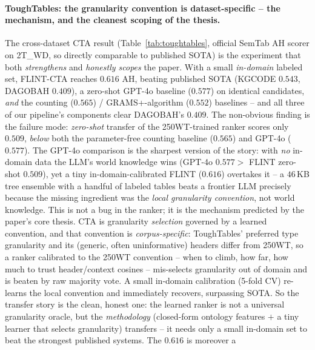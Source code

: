 \paragraph{ToughTables: the granularity convention is dataset-specific -- the mechanism, and the cleanest scoping of the thesis.}
The cross-dataset CTA result (Table~\ref{tab:toughtables}, official SemTab AH scorer
on 2T\_WD, so directly comparable to published SOTA) is the experiment that both
\emph{strengthens} and \emph{honestly scopes} the paper. With a small \emph{in-domain}
labeled set, FLINT-CTA reaches $\mathbf{0.616}$ AH, beating published SOTA (KGCODE
$0.543$, DAGOBAH $0.409$), a zero-shot GPT-4o baseline ($0.577$) on identical
candidates, \emph{and} the counting ($0.565$) / GRAMS+-algorithm ($0.552$) baselines
-- and all three of our pipeline's components clear DAGOBAH's $0.409$. The non-obvious
finding is the failure mode: \emph{zero-shot} transfer of the 250WT-trained ranker
scores only $0.509$, \emph{below} both the parameter-free counting baseline ($0.565$)
and GPT-4o ($0.577$). The GPT-4o comparison is the sharpest version of the story: with
\emph{no} in-domain data the LLM's world knowledge wins (GPT-4o $0.577 >$ FLINT
zero-shot $0.509$), yet a tiny in-domain-calibrated FLINT ($0.616$) overtakes it -- a
$46$\,KB tree ensemble with a handful of labeled tables beats a frontier LLM precisely
because the missing ingredient was the \emph{local granularity convention}, not world
knowledge. This is not a bug in the ranker; it is the mechanism predicted by the
paper's core thesis. CTA is granularity
\emph{selection} governed by a learned convention, and that convention is
\emph{corpus-specific}: ToughTables' preferred type granularity and its (generic,
often uninformative) headers differ from 250WT, so a ranker calibrated to the 250WT
convention -- when to climb, how far, how much to trust header/context cosines -- mis-selects
granularity out of domain and is beaten by raw majority vote. A small in-domain
calibration (5-fold CV) re-learns the local convention and immediately recovers,
surpassing SOTA. So the transfer story is the clean, honest one: the learned ranker is
not a universal granularity oracle, but the \emph{methodology} (closed-form ontology
features $+$ a tiny learner that selects granularity) transfers -- it needs only a
small in-domain set to beat the strongest published systems. The $0.616$ is moreover a

